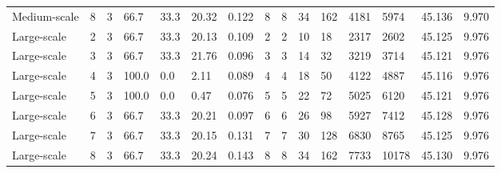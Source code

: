 \begin{longtable}{llrllllllllllll}
Medium-scale & 8 & 3 & 66.7 & 33.3 & 20.32 & 0.122 & 8 & 8 & 34 & 162 & 4181 & 5974 & 45.136 & 9.970 \\
Large-scale & 2 & 3 & 66.7 & 33.3 & 20.13 & 0.109 & 2 & 2 & 10 & 18 & 2317 & 2602 & 45.125 & 9.976 \\
Large-scale & 3 & 3 & 66.7 & 33.3 & 21.76 & 0.096 & 3 & 3 & 14 & 32 & 3219 & 3714 & 45.121 & 9.976 \\
Large-scale & 4 & 3 & 100.0 & 0.0 & 2.11 & 0.089 & 4 & 4 & 18 & 50 & 4122 & 4887 & 45.116 & 9.976 \\
Large-scale & 5 & 3 & 100.0 & 0.0 & 0.47 & 0.076 & 5 & 5 & 22 & 72 & 5025 & 6120 & 45.121 & 9.976 \\
Large-scale & 6 & 3 & 66.7 & 33.3 & 20.21 & 0.097 & 6 & 6 & 26 & 98 & 5927 & 7412 & 45.128 & 9.976 \\
Large-scale & 7 & 3 & 66.7 & 33.3 & 20.15 & 0.131 & 7 & 7 & 30 & 128 & 6830 & 8765 & 45.125 & 9.976 \\
Large-scale & 8 & 3 & 66.7 & 33.3 & 20.24 & 0.143 & 8 & 8 & 34 & 162 & 7733 & 10178 & 45.130 & 9.976 \\
\end{longtable}
